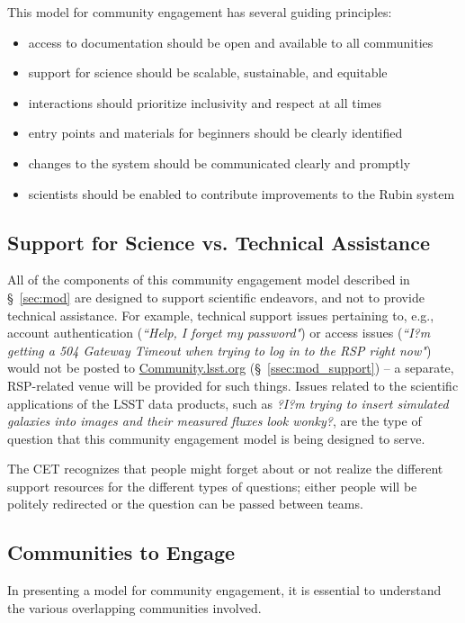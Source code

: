 \documentclass[DM,lsstdraft,toc]{lsstdoc}
\begin{document}
This model for community engagement has several guiding principles:
\begin{itemize}
\item access to documentation should be open and available to all communities
\item support for science should be scalable, sustainable, and equitable
\item interactions should prioritize inclusivity and respect at all times
\item entry points and materials for beginners should be clearly identified
\item changes to the system should be communicated clearly and promptly
\item scientists should be enabled to contribute improvements to the Rubin system
\end{itemize}


\subsection{Support for Science vs. Technical Assistance}\label{ssec:intro_tech}

All of the components of this community engagement model described in \S~\ref{sec:mod} are designed to support scientific endeavors, and not to provide technical assistance.
For example, technical support issues pertaining to, e.g., account authentication (\textit{``Help, I forget my password"}) or access issues (\textit{``I?m getting a 504 Gateway Timeout when trying to log in to the RSP right now"}) would not be posted to \url{Community.lsst.org} (\S~\ref{ssec:mod_support}) -- a separate, RSP-related venue will be provided for such things.
Issues related to the scientific applications of the LSST data products, such as \textit{?I?m trying to insert simulated galaxies into images and their measured fluxes look wonky?}, are the type of question that this community engagement model is being designed to serve.

The CET recognizes that people might forget about or not realize the different support resources for the different types of questions; either people will be politely redirected or the question can be passed between teams.


\subsection{Communities to Engage}\label{ssec:intro_comms}

In presenting a model for community engagement, it is essential to understand the various overlapping communities involved.
\end{document}
